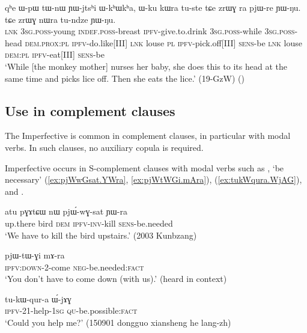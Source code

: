 \begin{exe}
\ex \label{ex:YWjtshi.WkhWkha}
\gll qʰe ɯ-pɯ tɯ-nɯ ɲɯ-jtsʰi ɯ-kʰɯkʰa,  ɯ-ku kɯra tu-ste tɕe zrɯɣ ra pjɯ-re ɲɯ-ŋu.  tɕe zrɯɣ nɯra tu-ndze ɲɯ-ŋu. \\
\textsc{lnk} \textsc{3sg}.\textsc{poss}-young \textsc{indef}.\textsc{poss}-breast \textsc{ipfv}-give.to.drink \textsc{3sg}.\textsc{poss}-while \textsc{3sg}.\textsc{poss}-head \textsc{dem}.\textsc{prox}:\textsc{pl} \textsc{ipfv}-do.like[III] \textsc{lnk} louse \textsc{pl} \textsc{ipfv}-pick.off[III] \textsc{sens}-be \textsc{lnk} louse \textsc{dem}:\textsc{pl} \textsc{ipfv}-eat[III] \textsc{sens}-be \\
\glt `While [the monkey mother] nurses her baby, she does this to its head at the same time and picks lice off. Then she eats the lice.' (19-GzW)
()
\end{exe}

\subsection{Use in complement clauses} \label{sec:ipfv.complement}
The Imperfective is common in complement clauses, in particular with modal verbs. In such clauses, no auxiliary copula is required.

Imperfective occurs in S-complement clauses with modal verbs such as , `be necessary' (\ref{ex:pjWwGsat.YWra}, \ref{ex:pjWtWGi.mAra}),  (\ref{ex:tukWqura.WjAG}),  and . 

\begin{exe}
\ex \label{ex:pjWwGsat.YWra}
\gll  atu pɣɤtɕɯ nɯ pjɯ́-wɣ-sat ɲɯ-ra \\
up.there bird \textsc{dem} \textsc{ipfv}-\textsc{inv}-kill \textsc{sens}-be.needed \\
\glt `We have to kill the bird upstairs.' (2003 Kunbzang)
\end{exe}

\begin{exe}
\ex \label{ex:pjWtWGi.mAra}
\gll pjɯ-tɯ-ɣi mɤ-ra \\
\textsc{ipfv}:\textsc{down}-2-come \textsc{neg}-be.needed:\textsc{fact} \\
\glt `You don't have to come down (with us).' (heard in context)
\end{exe}

\begin{exe}
\ex \label{ex:tukWqura.WjAG}
\gll tu-kɯ-qur-a ɯ́-jɤɣ \\
\textsc{ipfv}-2\fl{}1-help-\textsc{1sg} \textsc{qu}-be.possible:\textsc{fact} \\
\glt `Could you help me?' (150901 dongguo xiansheng he lang-zh)
\end{exe}

